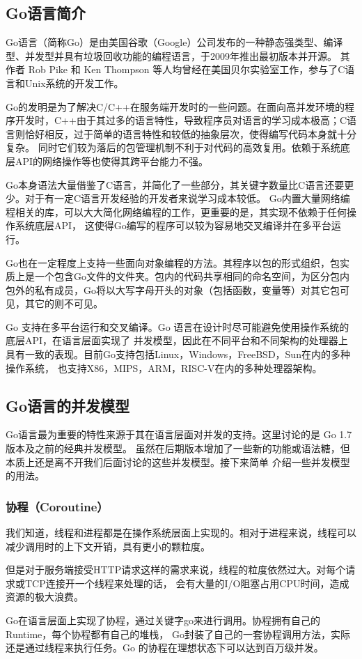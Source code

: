 \documentclass[twoside]{CUGThesis}
\begin{document}
	\subsection{Go语言简介}
	Go语言（简称Go）是由美国谷歌（Google）公司发布的一种静态强类型、编译型、并发型并具有垃圾回收功能的编程语言\cite{donovan2015go}，于2009年推出最初版本并开源。
	其作者 Rob Pike 和 Ken Thompson 等人均曾经在美国贝尔实验室工作，参与了C语言和Unix系统的开发工作。\par 
	Go的发明是为了解决C/C++在服务端开发时的一些问题。在面向高并发环境的程序开发时，C++由于其过多的语言特性，导致程序员对语言的学习成本极高；C语言则恰好相反，过于简单的语言特性和较低的抽象层次，使得编写代码本身就十分复杂。
	同时它们较为落后的包管理机制不利于对代码的高效复用。依赖于系统底层API的网络操作等也使得其跨平台能力不强。\par
	Go本身语法大量借鉴了C语言，并简化了一些部分，其关键字数量比C语言还要更少。对于有一定C语言开发经验的开发者来说学习成本较低。
	Go内置大量网络编程相关的库，可以大大简化网络编程的工作，更重要的是，其实现不依赖于任何操作系统底层API，
	这使得Go编写的程序可以较为容易地交叉编译并在多平台运行。\par
	Go也在一定程度上支持一些面向对象编程的方法。其程序以包的形式组织，包实质上是一个包含Go文件的文件夹。包内的代码共享相同的命名空间，为区分包内
	包外的私有成员，Go将以大写字母开头的对象（包括函数，变量等）对其它包可见，其它的则不可见。\par 
	Go 支持在多平台运行和交叉编译。Go 语言在设计时尽可能避免使用操作系统的底层API，在语言层面实现了
	并发模型，因此在不同平台和不同架构的处理器上具有一致的表现。目前Go支持包括Linux，Windows，FreeBSD，Sun在内的多种操作系统，
	也支持X86，MIPS，ARM，RISC-V在内的多种处理器架构。\par
	\subsection{Go语言的并发模型}
	Go语言最为重要的特性来源于其在语言层面对并发的支持。这里讨论的是 Go 1.7 版本及之前的经典并发模型。
	虽然在后期版本增加了一些新的功能或语法糖，但本质上还是离不开我们后面讨论的这些并发模型。接下来简单
	介绍一些并发模型的用法。
	\subsubsection{协程（Coroutine）}
	我们知道，线程和进程都是在操作系统层面上实现的。相对于进程来说，线程可以减少调用时的上下文开销，具有更小的颗粒度。\par 
	但是对于服务端接受HTTP请求这样的需求来说，线程的粒度依然过大。对每个请求或TCP连接开一个线程来处理的话，
	会有大量的I/O阻塞占用CPU时间，造成资源的极大浪费。\par 
	Go在语言层面上实现了协程，通过关键字go来进行调用。协程拥有自己的Runtime，每个协程都有自己的堆栈，
	Go封装了自己的一套协程调用方法，实际还是通过线程来执行任务。Go 的协程在理想状态下可以达到百万级并发\cite{deshpande2012analysis}。
\end{document}
